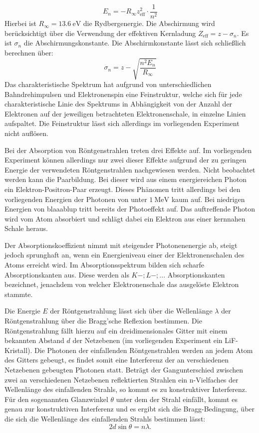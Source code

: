 \begin{equation}
  E_n=-R_\infty z_\mathrm{eff}^2 \cdot \frac{1}{n^2}
\end{equation}
Hierbei ist $R_\infty=\SI{13.6}{\electronvolt}$ die Rydbergenergie. Die Abschirmung wird berücksichtigt über die Verwendung der effektiven Kernladung $Z_\mathrm{eff}=z-\sigma_n$. Es ist $\sigma_n$ die Abschirmungskonstante.
Die Abschirmkonstante lässt sich schließlich berechnen über:
\begin{equation}
  \sigma_n=z-\sqrt{\frac{n^2 E_n}{R_\infty}}
\end{equation}
Das charakteristische Spektrum hat aufgrund von unterschiedlichen Bahndrehimpulsen und Elektronenspin eine Feinstruktur, welche sich für jede charakteristische Linie des Spektrums in Abhängigkeit von der Anzahl der Elektronen auf der jeweiligen betrachteten Elektronenschale, in einzelne Linien aufspaltet.
Die Feinstruktur lässt sich allerdings im vorliegenden Experiment nicht auflösen.

Bei der Absorption von Röntgenstrahlen treten drei Effekte auf. Im vorliegenden Experiment können allerdings nur zwei dieser Effekte aufgrund der zu geringen Energie der verwendeten Röntgenstrahlen nachgewiesen werden.
Nicht beobachtet werden kann die Paarbildung. Bei dieser wird aus einem energiereichen Photon ein Elektron-Positron-Paar erzeugt. Dieses Phänomen tritt allerdings bei den vorliegenden Energien der Photonen von unter $\SI{1}{\mega\electronvolt}$ kaum auf.
Bei niedrigen Energien von blaaablup tritt bereits der Photoeffekt auf. Das auftreffende Photon wird vom Atom absorbiert und schlägt dabei ein Elektron aus einer kernnahen Schale heraus.

Der Absorptionskoeffizient nimmt mit steigender Photonenenergie ab, steigt jedoch sprunghaft an, wenn ein Energieniveau einer der Elektronenschalen des Atoms erreicht wird.
Im Absorptionsspektrum bilden sich scharfe Absorptionskanten aus. Diese werden als $K-;L-;...$ Absorptionskanten bezeichnet, jenachdem von welcher Elektronenschale das ausgelöste Elektron stammte.


Die Energie $E$ der Röntgenstrahlung lässt sich über die Wellenlänge $\lambda$ der Röntgenstrahlung über die Bragg'sche Reflexion bestimmen.
Die Röntgenstrahlung fällt hierzu auf ein dreidimensionales Gitter mit einem bekannten Abstand $d$ der Netzebenen (im vorliegenden Experiment ein LiF-Kristall). Die Photonen der einfallenden Röntgenstrahlen werden an jedem Atom des Gitters gebeugt, es findet somit eine Interferenz der an verschiedenen Netzebenen gebeugten Photonen statt.
Beträgt der Gangunterschied zwischen zwei an verschiedenen Netzebenen reflektierten Strahlen ein n-Vielfaches der Wellenlänge des einfallenden Strahls, so kommt es zu konstruktiver Interferenz.
Für den sogenannten Glanzwinkel $\theta$ unter dem der Strahl einfällt, kommt es genau zur konstruktiven Interferenz und  es ergibt sich die Bragg-Bedingung, über die sich die Wellenlänge des einfallenden Strahls bestimmen lässt:
\begin{equation}
	\label{eqn:braggii}
  2d \sin{\theta}=n\lambda \text{.}
\end{equation}



\cite{Anleitung}
